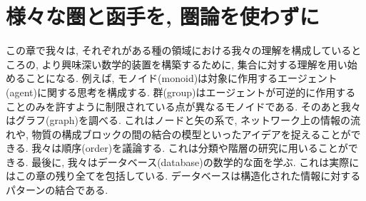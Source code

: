 

\chapter{様々な圏と函手を, 圏論を使わずに}\label{chap:categories and functors without admitting it}


この章で我々は, それぞれがある種の領域における我々の理解を構成しているところの, より興味深い数学的装置を構築するために, 集合に対する理解を用い始めることになる. 例えば, モノイド(monoid)は対象に作用するエージェント(agent)に関する思考を構成する. 群(group)はエージェントが可逆的に作用することのみを許すように制限されている点が異なるモノイドである. そのあと我々はグラフ(graph)を調べる. これはノードと矢の系で, ネットワーク上の情報の流れや, 物質の構成ブロックの間の結合の模型といったアイデアを捉えることができる. 我々は順序(order)を議論する. これは分類や階層の研究に用いることができる. 最後に, 我々はデータベース(database)の数学的な面を学ぶ. これは実際にはこの章の残り全てを包括している. データベースは構造化された情報に対するパターンの結合である.



